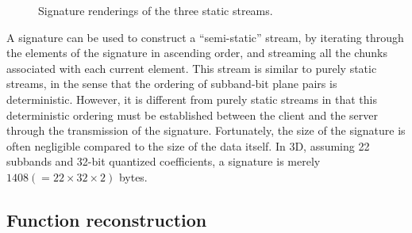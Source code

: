\begin{figure}[h]
  \centering
 	\caption{Signature renderings of the three static streams.}
 	\label{fig:signature-static}
\end{figure}

A signature can be used to construct a ``semi-static'' stream, by iterating through the elements of
the signature in ascending order, and streaming all the chunks associated with each current element.
This stream is similar to purely static streams, in the sense that the ordering of subband-bit plane
pairs is deterministic. However, it is different from purely static streams in that this
deterministic ordering must be established between the client and the server through the
transmission of the signature. Fortunately, the size of the signature is often negligible compared
to the size of the data itself. In 3D, assuming 22 subbands and 32-bit quantized coefficients, a
signature is merely $1408 (=22\times 32\times 2)$ bytes.

\subsection{Function reconstruction}
\label{sec:rmse-optimized}


